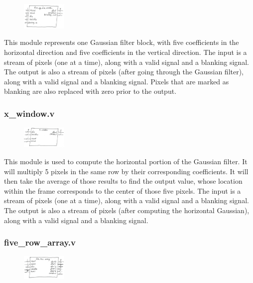 \documentclass[12pt]{article}
\begin{document}
\begin{figure}
    \includegraphics[width=0.19\textwidth]{processed_image_pngs/black_box_modules/five_by_five_window_blackbox.png}
\end{figure}

This module represents one Gaussian filter block, with five coefficients in the 
horizontal direction and five coefficients in the vertical direction. The input 
is a stream of pixels (one at a time), along with a valid signal and a blanking 
signal. The output is also a stream of pixels (after going through the Gaussian 
filter), along with a valid signal and a blanking signal. Pixels that are 
marked as blanking are also replaced with zero prior to the output.

\subsubsection{x\_window.v}

\begin{figure}
    \includegraphics[width=0.19\textwidth]{processed_image_pngs/black_box_modules/x_window_blackbox.png}
\end{figure}

This module is used to compute the horizontal portion of the Gaussian filter. 
It will multiply 5 pixels in the same row by their corresponding coefficients. 
It will then take the average of those results to find the output value, whose 
location within the frame corresponds to the center of those five pixels. The 
input is a stream of pixels (one at a time), along with a valid signal and a 
blanking signal. The output is also a stream of pixels (after computing the 
horizontal Gaussian), along with a valid signal and a blanking signal.

\subsubsection{five\_row\_array.v}

\begin{figure}
    \includegraphics[width=0.19\textwidth]{processed_image_pngs/black_box_modules/five_row_array_blackbox.png}
\end{figure}
\end{document}
